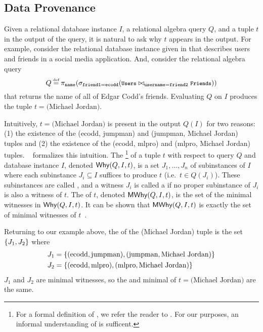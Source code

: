 \subsection{Data Provenance}
Given a relational database instance $I$, a relational algebra query $Q$, and a
tuple $t$ in the output of the query, it is natural to ask why $t$ appears in
the output. For example, consider the relational database instance given in
 that describes users and friends in a social media
application.  And, consider the relational algebra query
\[
  \footnotesize
  Q \defeq \pi_{\ttt{name}}(
             \sigma_{\ttt{friend1} = \ttt{ecodd}}(
                \ttt{Users} \join_{\ttt{username} = \ttt{friend2}} \ttt{Friends}
             )
           )
\]
that returns the name of all of Edgar Codd's friends. Evaluating $Q$ on $I$
produces the tuple $t = \text{(Michael Jordan)}$.

{}

Intuitively, $t = \text{(Michael Jordan)}$ is present in the output $Q(I)$ for
two reasons: (1) the existence of the (ecodd, jumpman) and (jumpman, Michael
Jordan) tuples and (2) the existence of the (ecodd, mlpro) and (mlpro, Michael
Jordan) tuples.  ~\cite{buneman2001and,
cheney2009provenance} formalizes this intuition. The
\whyprovenance{}\footnote{
  For a formal definition of \whyprovenance{}, we refer the reader to
  \cite{cheney2009provenance}. For our purposes, an informal understanding of
  \whyprovenance{} is sufficent.
}
of a tuple $t$ with respect to query $Q$ and database instance $I$, denoted
$\textsf{Why}(Q, I, t)$, is a set $J_1, \ldots, J_n$ of subinstances of $I$ where each
subinstance $J_i \subseteq I$ suffices to produce $t$ (i.e.\ $t \in Q(J_i)$).
These subinstances are called , and a witness $J_i$
is called a  if no proper subinstance of $J_i$
is also a witness of $t$. The  of $t$,
denoted $\textsf{MWhy}(Q, I, t)$, is the set of the minimal witnesses in $\textsf{Why}(Q, I,
t)$. It can be shown that $\textsf{MWhy}(Q, I, t)$ is exactly the set of minimal
witnesses of $t$~\cite{cheney2009provenance}.

Returning to our example above, the \whyprovenance{} of the (Michael Jordan)
tuple is the set $\{J_1, J_2\}$ where
\begin{align*}
  J_1 &= \{(\text{ecodd}, \text{jumpman}), (\text{jumpman}, \text{Michael Jordan})\} \\
  J_2 &= \{(\text{ecodd}, \text{mlpro}), (\text{mlpro}, \text{Michael Jordan})\}
\end{align*}
$J_1$ and $J_2$ are minimal witnesses, so the \whyprovenance{} and minimal
\whyprovenance{} of $t = \text{(Michael Jordan)}$ are the same.

